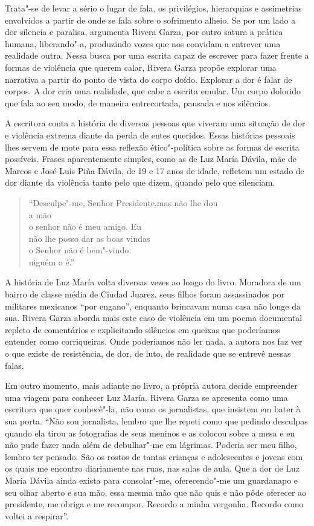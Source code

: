 Trata"-se de levar a sério o lugar de fala, os privilégios, hierarquias e
assimetrias envolvidos a partir de onde se fala sobre o sofrimento
alheio. Se por um lado a dor silencia e paralisa, argumenta Rivera
Garza, por outro satura a prática humana, liberando"-a, produzindo vozes
que nos convidam a entrever uma realidade outra. Nessa busca por uma
escrita capaz de escrever para fazer frente a formas de violência que
querem calar, Rivera Garza propõe explorar uma narrativa a partir do
ponto de vista do corpo doído. Explorar a dor é falar de corpos. A dor
cria uma realidade, que cabe a escrita emular. Um corpo dolorido que
fala ao seu modo, de maneira entrecortada, pausada e nos silêncios.

A escritora conta a história de diversas pessoas que viveram uma
situação de dor e violência extrema diante da perda de entes queridos.
Essas histórias pessoais lhes servem de mote para essa reflexão
ético"-política sobre as formas de escrita possíveis. Frases
aparentemente simples, como as de Luz María Dávila, mãe de Marcos e José
Luis Piña Dávila, de 19 e 17 anos de idade, refletem um estado de dor
diante da violência tanto pelo que dizem, quando pelo que silenciam.

\begin{verse}
``Desculpe"-me, Senhor Presidente,\qb{}mas não lhe dou\\
a mão\\
o senhor não é meu amigo. Eu\\
não lhe posso dar as boas vindas\\
o Senhor não é bem"-vindo.\\
niguém o é.''
\end{verse}

A história de Luz María volta diversas vezes ao longo do livro. Moradora
de um bairro de classe média de Ciudad Juarez, seus filhos foram
assassinados por militares mexicanos ``por engano'', enquanto brincavam
numa casa não longe da sua. Rivera Garza aborda mais este caso de
violência em um poema documental repleto de comentários e explicitando
silêncios em queixas que poderíamos entender como corriqueiras. Onde
poderíamos não ler nada, a autora nos faz ver o que existe de
resistência, de dor, de luto, de realidade que se entrevê nessas falas.

Em outro momento, mais adiante no livro, a própria autora decide
empreender uma viagem para conhecer Luz María. Rivera Garza se apresenta
como uma escritora que quer conhecê"-la, não como os jornalistas, que
insistem em bater à sua porta. ``Não sou jornalista, lembro que lhe
repeti como que pedindo desculpas quando ela tirou as fotografias de
seus meninos e as colocou sobre a mesa e eu não pude fazer nada além de
debulhar"-me em lágrimas. Poderia ser meu filho, lembro ter pensado. São
os rostos de tantas crianças e adolescentes e jovens com os quais me
encontro diariamente nas ruas, nas salas de aula. Que a dor de Luz María
Dávila ainda exista para consolar"-me, oferecendo"-me um guardanapo e seu
olhar aberto e sua mão, essa mesma mão que não quis e não pôde oferecer
ao presidente, me obriga e me recompor. Recordo a minha vergonha.
Recordo como voltei a respirar''.

